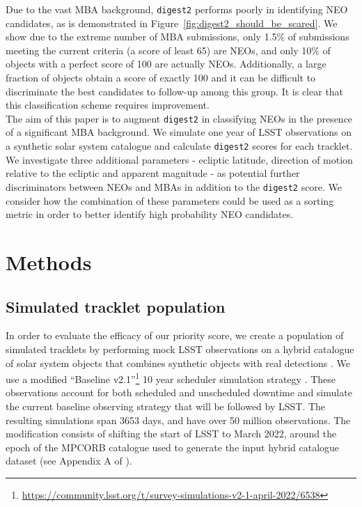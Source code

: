 \documentclass[twocolumn]{aastex631}
\newcommand{\dig}{\texttt{digest2}}
\begin{document}
Due to the vast MBA background, \dig{} performs poorly in identifying NEO candidates, as is demonstrated in Figure~\ref{fig:digest2_should_be_scared}. We show due to the extreme number of MBA submissions, only 1.5\% of submissions meeting the current criteria (a score of least 65) are NEOs, and only 10\% of objects with a perfect score of 100 are actually NEOs. Additionally, a large fraction of objects obtain a score of exactly 100 and it can be difficult to discriminate the best candidates to follow-up among this group. It is clear that this classification scheme requires improvement.
\\

The aim of this paper is to augment \dig{} in classifying NEOs in the presence of a significant MBA background. We simulate one year of LSST observations on a synthetic solar system catalogue and calculate \dig{} scores for each tracklet. We investigate three additional parameters - ecliptic latitude, direction of motion relative to the ecliptic and apparent magnitude - as potential further discriminators between NEOs and MBAs in addition to the \dig{} score. We consider how the combination of these parameters could be used as a sorting metric in order to better identify high probability NEO candidates.

\section{Methods}

\subsection{Simulated tracklet population}

In order to evaluate the efficacy of our priority score, we create a population of simulated tracklets by performing mock LSST observations on a hybrid catalogue of solar system objects that combines synthetic objects with real detections \citep[Appendix A of][]{sky-is-falling,Grav+2011}. We use a modified ``Baseline v2.1''\footnote{\url{https://community.lsst.org/t/survey-simulations-v2-1-april-2022/6538}} 10 year scheduler simulation strategy \citep{Naghib+2019, Cornwall+2020}. These observations account for both scheduled and unscheduled downtime and simulate the current baseline observing strategy that will be followed by LSST. The resulting simulations span 3653 days, and have over 50 million observations. The modification consists of shifting the start of LSST to March 2022, around the epoch of the MPCORB catalogue used to generate the input hybrid catalogue dataset (see Appendix A of \citealp{sky-is-falling}).
\end{document}
